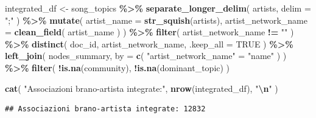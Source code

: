 \documentclass[
]{article}
\newenvironment{Shaded}{\begin{snugshade}}{\end{snugshade}}
\newcommand{\AttributeTok}[1]{\textcolor[rgb]{0.13,0.29,0.53}{#1}}
\newcommand{\ConstantTok}[1]{\textcolor[rgb]{0.56,0.35,0.01}{#1}}
\newcommand{\FunctionTok}[1]{\textcolor[rgb]{0.13,0.29,0.53}{\textbf{#1}}}
\newcommand{\NormalTok}[1]{#1}
\newcommand{\OtherTok}[1]{\textcolor[rgb]{0.56,0.35,0.01}{#1}}
\newcommand{\SpecialCharTok}[1]{\textcolor[rgb]{0.81,0.36,0.00}{\textbf{#1}}}
\newcommand{\StringTok}[1]{\textcolor[rgb]{0.31,0.60,0.02}{#1}}
\begin{document}
\begin{Shaded}
\begin{Highlighting}[]
\NormalTok{integrated\_df }\OtherTok{\textless{}{-}}\NormalTok{ song\_topics }\SpecialCharTok{\%\textgreater{}\%}
  \FunctionTok{separate\_longer\_delim}\NormalTok{(}
\NormalTok{    artists,}
    \AttributeTok{delim =} \StringTok{";"}
\NormalTok{  ) }\SpecialCharTok{\%\textgreater{}\%}
  \FunctionTok{mutate}\NormalTok{(}
    \AttributeTok{artist\_name =} \FunctionTok{str\_squish}\NormalTok{(artists),}
    \AttributeTok{artist\_network\_name =} \FunctionTok{clean\_field}\NormalTok{(}
\NormalTok{      artist\_name}
\NormalTok{    )}
\NormalTok{  ) }\SpecialCharTok{\%\textgreater{}\%}
  \FunctionTok{filter}\NormalTok{(}
\NormalTok{    artist\_network\_name }\SpecialCharTok{!=} \StringTok{""}
\NormalTok{  ) }\SpecialCharTok{\%\textgreater{}\%}
  \FunctionTok{distinct}\NormalTok{(}
\NormalTok{    doc\_id,}
\NormalTok{    artist\_network\_name,}
    \AttributeTok{.keep\_all =} \ConstantTok{TRUE}
\NormalTok{  ) }\SpecialCharTok{\%\textgreater{}\%}
  \FunctionTok{left\_join}\NormalTok{(}
\NormalTok{    nodes\_summary,}
    \AttributeTok{by =} \FunctionTok{c}\NormalTok{(}
      \StringTok{"artist\_network\_name"} \OtherTok{=} \StringTok{"name"}
\NormalTok{    )}
\NormalTok{  ) }\SpecialCharTok{\%\textgreater{}\%}
  \FunctionTok{filter}\NormalTok{(}
    \SpecialCharTok{!}\FunctionTok{is.na}\NormalTok{(community),}
    \SpecialCharTok{!}\FunctionTok{is.na}\NormalTok{(dominant\_topic)}
\NormalTok{  )}

\FunctionTok{cat}\NormalTok{(}
  \StringTok{"Associazioni brano{-}artista integrate:"}\NormalTok{,}
  \FunctionTok{nrow}\NormalTok{(integrated\_df),}
  \StringTok{"}\SpecialCharTok{\textbackslash{}n}\StringTok{"}
\NormalTok{)}
\end{Highlighting}
\end{Shaded}

\begin{verbatim}
## Associazioni brano-artista integrate: 12832
\end{verbatim}

\begin{Shaded}
\end{Shaded}
\end{document}
